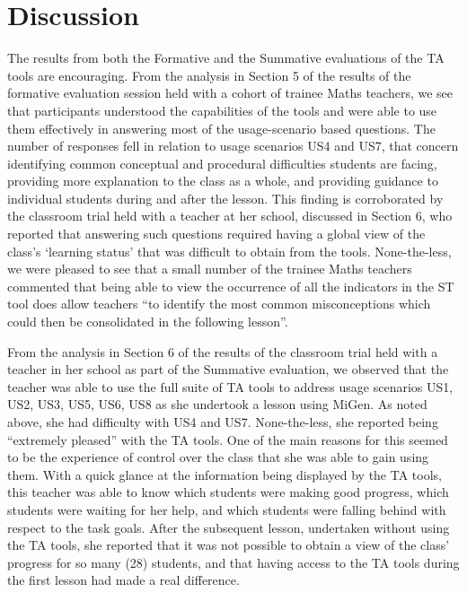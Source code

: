 \section{Discussion}
\label{sec:discussion}

The results from both the Formative and the Summative evaluations of
the TA tools are encouraging. From the analysis in Section 5 of the results 
of the formative evaluation session held with a cohort of trainee Maths teachers,
we see that participants understood the capabilities of
the tools and were able to use them effectively in answering most
of the usage-scenario based questions. 
The number of responses fell in relation to usage scenarios US4 and US7, 
that concern identifying common conceptual and procedural difficulties
students are facing, 
providing more explanation to the class as a whole, and 
providing guidance to individual students during and after the lesson.
This finding is corroborated by the 
classroom trial held with a teacher at her school, discussed in Section 6,
who reported that answering such questions
required having a global view of the class's `learning status' 
that was difficult to obtain from the tools.
None-the-less, we were pleased to see that a small number of the 
trainee Maths teachers commented that being able to view the occurrence 
of all the indicators in the ST tool does allow teachers
``to identify the most common misconceptions which could then be
consolidated in the following lesson''. 


From the analysis in Section 6 of the results of the classroom trial held with a
teacher in her school as part of the Summative evaluation,
we observed that the teacher was able to use the full suite of TA
tools to address usage scenarios US1, US2, US3, US5, US6, US8 as she undertook a
lesson using MiGen. As noted above, she had difficulty with US4 and US7.
None-the-less, she reported being ``extremely pleased'' with the TA tools. 
One of the main reasons for this seemed to be the experience of control over the class
that she was able to gain using them. With a quick glance at the information being
displayed by the TA tools, this teacher was able to know which students
were making good progress, which students were waiting for her help,
and which students were falling behind with respect to the task goals.
After the subsequent lesson, undertaken without using the TA tools,
she reported that it was not possible to obtain a view
of the class' progress for so many (28) students, 
and that having access to the TA tools during the first lesson 
had made a real difference. 

